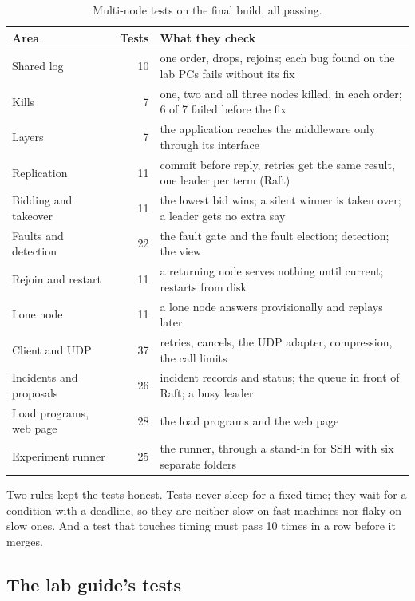 \begin{table}[!htb]
\centering\small
\caption{Multi-node tests on the final build, all passing.}
\label{tab:testfiles}
\begin{tabularx}{\linewidth}{@{}P{3.6cm}rL@{}}
\toprule
Area & Tests & What they check \\
\midrule
Shared log & 10 & one order, drops, rejoins; each bug found on the lab PCs fails without its fix \\
Kills & 7 & one, two and all three nodes killed, in each order; 6 of 7 failed before the fix \\
Layers & 7 & the application reaches the middleware only through its interface \\
Replication & 11 & commit before reply, retries get the same result, one leader per term (Raft) \\
Bidding and takeover & 11 & the lowest bid wins; a silent winner is taken over; a leader gets no extra say \\
Faults and detection & 22 & the fault gate and the fault election; detection; the view \\
Rejoin and restart & 11 & a returning node serves nothing until current; restarts from disk \\
Lone node & 11 & a lone node answers provisionally and replays later \\
Client and UDP & 37 & retries, cancels, the UDP adapter, compression, the call limits \\
Incidents and proposals & 26 & incident records and status; the queue in front of Raft; a busy leader \\
Load programs, web page & 28 & the load programs and the web page \\
Experiment runner & 25 & the runner, through a stand-in for SSH with six separate folders \\
\bottomrule
\end{tabularx}
\end{table}

Two rules kept the tests honest. Tests never sleep for a fixed time; they wait for a condition with a deadline, so they are neither slow on fast machines nor flaky on slow ones. And a test that touches timing must pass 10 times in a row before it merges.

\subsection{The lab guide's tests}

